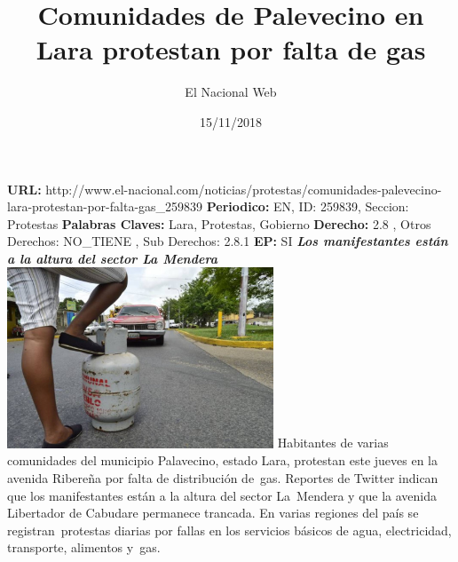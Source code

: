 \documentclass{article}%
\title{\textbf{Comunidades de Palevecino en Lara protestan por falta de gas}}%
\author{El Nacional Web}%
\date{15/11/2018}%
\begin{document}
%
\normalsize%
\maketitle%
\textbf{URL: }%
http://www.el{-}nacional.com/noticias/protestas/comunidades{-}palevecino{-}lara{-}protestan{-}por{-}falta{-}gas\_259839\newline%
%
\textbf{Periodico: }%
EN, %
ID: %
259839, %
Seccion: %
Protestas\newline%
%
\textbf{Palabras Claves: }%
Lara, Protestas, Gobierno\newline%
%
\textbf{Derecho: }%
2.8%
, Otros Derechos: %
NO\_TIENE%
, Sub Derechos: %
2.8.1%
\newline%
%
\textbf{EP: }%
SI\newline%
\newline%
%
\textbf{\textit{Los manifestantes están a la altura del sector La Mendera}}%
\newline%
\newline%
%
\includegraphics[width=300px]{34.jpg}%
\newline%
%
Habitantes de varias comunidades del municipio Palavecino, estado Lara, protestan este jueves en la avenida Ribereña por falta de distribución de~gas.%
\newline%
%
Reportes de Twitter indican que los manifestantes están a la altura del sector La~Mendera y que la avenida Libertador de Cabudare permanece trancada.%
\newline%
%
En varias regiones del país se registran~protestas diarias por fallas en los servicios básicos de agua, electricidad, transporte, alimentos y~gas.%
\newline%
%
\end{document}
